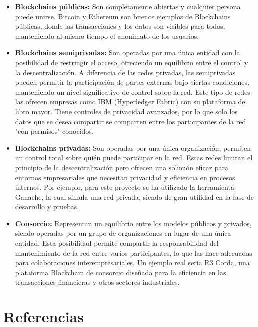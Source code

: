 \begin{itemize}
\item \textbf{Blockchains públicas:} Son completamente abiertas y cualquier persona puede unirse. Bitcoin y Ethereum son buenos ejemplos de Blockchains públicas, donde las transacciones y los datos son visibles para todos, manteniendo al mismo tiempo el anonimato de los usuarios.

\item \textbf{Blockchains semiprivadas:} Son operadas por una única entidad con la posibilidad de restringir el acceso, ofreciendo un equilibrio entre el control y la descentralización. A diferencia de las redes privadas, las semiprivadas pueden permitir la participación de partes externas bajo ciertas condiciones, manteniendo un nivel significativo de control sobre la red.
Este tipo de redes las ofrecen empresas como IBM (Hyperledger Fabric) con su plataforma de libro mayor. Tiene controles de privacidad avanzados, por lo que solo los datos que se desea compartir se comparten entre los participantes de la red "con permisos" conocidos.

\item \textbf{Blockchains privadas:} Son operadas por una única organización, permiten un control total sobre quién puede participar en la red. Estas redes limitan el principio de la descentralización pero ofrecen una solución eficaz para entornos empresariales que necesitan privacidad y eficiencia en procesos internos.
Por ejemplo, para este proyecto se ha utilizado la herramienta Ganache, la cual simula una red privada, siendo de gran utilidad en la fase de desarrollo y pruebas.

\item \textbf{Consorcio:} Representan un equilibrio entre los modelos públicos y privados, siendo operadas por un grupo de organizaciones en lugar de una única entidad. Esta posibilidad permite compartir la responsabilidad del mantenimiento de la red entre varios participantes, lo que las hace adecuadas para colaboraciones interempresariales. 
Un ejemplo real sería R3 Corda, una plataforma Blockchain de consorcio diseñada para la eficiencia en las transacciones financieras y otros sectores industriales.

\end{itemize} 


\section{Referencias}

